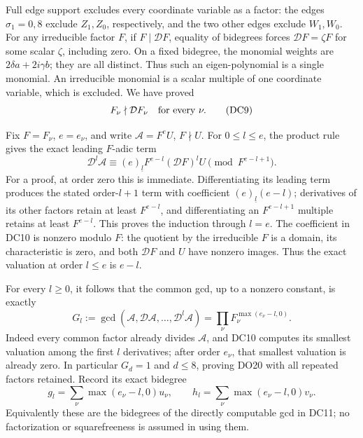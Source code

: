 \documentclass[11pt]{article}
\begin{document}
Full edge support excludes every coordinate variable as a factor:
the edges $\sigma_1=0,8$ exclude $Z_1,Z_0$, respectively, and the
two other edges exclude $W_1,W_0$.  For any irreducible factor $F$, if
$F\mid\mathcal DF$, equality of bidegrees forces
$\mathcal DF=\zeta F$ for some scalar $\zeta$, including zero.
On a fixed bidegree, the monomial weights are
$2\delta a+2i\gamma b$; they are all distinct.  Thus such an
eigen-polynomial is a single monomial.  An irreducible monomial is
a scalar multiple of one coordinate variable, which is excluded.
We have proved
\[
 F_\nu\nmid\mathcal D F_\nu\quad\hbox{for every }\nu.           \tag{DC9}
\]

Fix $F=F_\nu$, $e=e_\nu$, and write $\mathcal A=F^e U$, $F\nmid U$.
For $0\le l\le e$, the product rule gives the exact leading
$F$-adic term
\[
 \mathcal D^l\mathcal A
 \equiv (e)_{\underline l}F^{e-l}(\mathcal DF)^l U
                          \pmod {F^{e-l+1}}.                    \tag{DC10}
\]
For a proof, at order zero this is immediate.  Differentiating its
leading term produces the stated order-$l+1$ term with coefficient
$(e)_{\underline l}(e-l)$; derivatives of its other factors retain
at least $F^{e-l}$, and differentiating an $F^{e-l+1}$ multiple
retains at least $F^{e-l}$.  This proves the induction through $l=e$.
The coefficient in DC10 is nonzero modulo $F$: the quotient by the
irreducible $F$ is a domain, its characteristic is zero, and both
$\mathcal DF$ and $U$ have nonzero images.  Thus the exact valuation
at order $l\le e$ is $e-l$.

For every $l\ge0$, it follows that the common gcd, up to a nonzero
constant, is exactly
\[
 G_l:=\gcd(\mathcal A,\mathcal D\mathcal A,\ldots,
                       \mathcal D^l\mathcal A)
       =\prod_\nu F_\nu^{\max(e_\nu-l,0)}.                       \tag{DC11}
\]
Indeed every common factor already divides $\mathcal A$, and DC10
computes its smallest valuation among the first $l$ derivatives;
after order $e_\nu$, that smallest valuation is already zero.
In particular $G_d=1$ and $d\le8$, proving DO20 with all repeated
factors retained.  Record its exact bidegree
\[
 g_l=\sum_\nu\max(e_\nu-l,0)u_\nu,\qquad
 h_l=\sum_\nu\max(e_\nu-l,0)v_\nu.                              \tag{DC12}
\]
Equivalently these are the bidegrees of the directly computable gcd
in DC11; no factorization or squarefreeness is assumed in using them.
\end{document}
